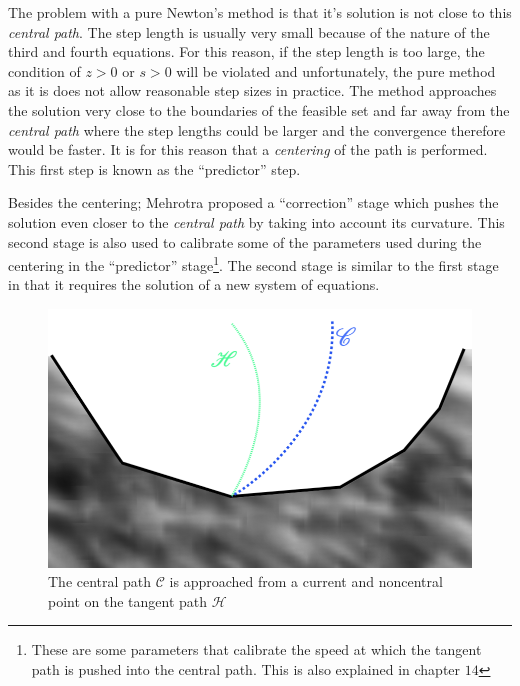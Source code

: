 The problem with a pure Newton's method is that it's solution is not close to this \emph{central path}. The step length is usually very small because of the nature of the third and fourth equations. For this reason, if the step length is too large, the condition of $z > 0$ or $s > 0$ will be violated and unfortunately, the pure method as it is does not allow reasonable step sizes in practice. The method approaches the solution very close to the boundaries of the feasible set and far away from the \emph{central path} where the step lengths could be larger and the convergence therefore would be faster. It is for this reason that a \emph{centering} of the path is performed. This first step is known as the ``predictor'' step.

Besides the centering; Mehrotra proposed a ``correction'' stage which pushes the solution even closer to the \emph{central path} by taking into account its curvature. This second stage is also used to calibrate some of the parameters used during the centering in the ``predictor'' stage\footnote{These are some parameters that calibrate the speed at which the tangent path is pushed into the central path. This is also explained in chapter $14$\citep{nocedal}}. The second stage is similar to the first stage in that it requires the solution of a new system of equations.

\begin{figure}
\begin{center}
\includegraphics[scale=0.3]{Figures/CentralPath.png}
\caption[The Central Path and the Tangent Path]{The central path $\mathcal{C}$ is approached from a current and noncentral point on the tangent path $\mathcal{H}$}
\end{center}
\end{figure}

